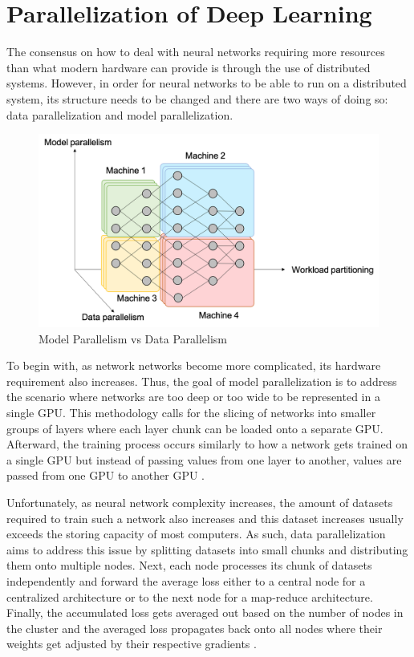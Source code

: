 \documentclass[conference]{IEEEtran}
\begin{document}
    \section{Parallelization of Deep Learning}
        The consensus on how to deal with neural networks requiring more resources than what modern hardware can provide is through the use of distributed systems. However, in order for neural networks to be able to run on a distributed system, its structure needs to be changed and there are two ways of doing so: data parallelization and model parallelization.

        \begin{figure}[!htb]
            \centering
            \captionsetup{justification=centering}
            \includegraphics[width=\linewidth]{Parallelism.png}
            \caption{Model Parallelism vs Data Parallelism \cite{ekanayake}}  
        \end{figure}

        To begin with, as network networks become more complicated, its hardware requirement also increases. Thus, the goal of model parallelization is to address the scenario where networks are too deep or too wide to be represented in a single GPU. This methodology calls for the slicing of networks into smaller groups of layers where each layer chunk can be loaded onto a separate GPU. Afterward, the training process occurs similarly to how a network gets trained on a single GPU but instead of passing values from one layer to another, values are passed from one GPU to another GPU \cite{ben-nun_hoefler_2019}.

        Unfortunately, as neural network complexity increases, the amount of datasets required to train such a network also increases and this dataset increases usually exceeds the storing capacity of most computers. As such, data parallelization aims to address this issue by splitting datasets into small chunks and distributing them onto multiple nodes. Next, each node processes its chunk of datasets independently and forward the average loss either to a central node for a centralized architecture or to the next node for a map-reduce architecture. Finally, the accumulated loss gets averaged out based on the number of nodes in the cluster and the averaged loss propagates back onto all nodes where their weights get adjusted by their respective gradients \cite{ben-nun_hoefler_2019}.
\end{document}
